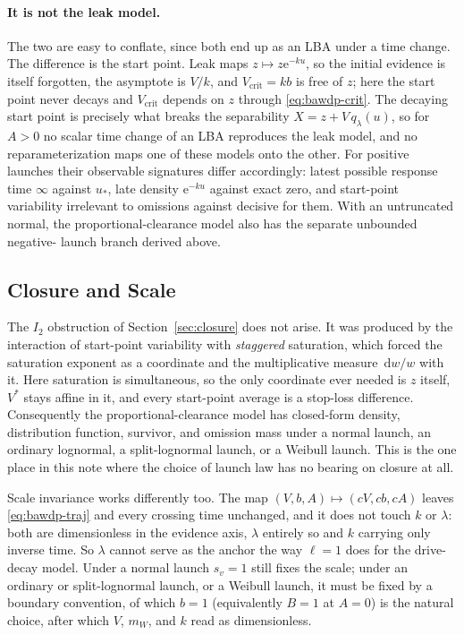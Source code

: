 \documentclass[12pt]{article}
\newcommand{\dd}{\,\mathrm{d}}
\newcommand{\e}{\mathrm{e}}
\theoremstyle{remark}
\begin{document}
\paragraph{It is not the leak model.} The two are easy to conflate, since both
end up as an LBA under a time change. The difference is the start point. Leak maps $z \mapsto z\e^{-ku}$, so the initial evidence is itself forgotten, the asymptote is $V/k$, and $V_{\mathrm{crit}} = kb$ is free of $z$; here the start point never decays and $V_{\mathrm{crit}}$ depends on $z$ through
\eqref{eq:bawdp-crit}. The decaying start point is precisely what breaks the
separability $X = z + V\,q_{\lambda}(u)$, so for $A > 0$ no scalar time change of an LBA reproduces the leak model, and no reparameterization maps one of these models onto the other. For positive launches their observable signatures differ accordingly: latest possible response time $\infty$ against $u_{*}$, late density $\e^{-ku}$ against exact zero, and start-point variability irrelevant to omissions against decisive for them. With an untruncated normal, the proportional-clearance model also has the separate unbounded negative- launch branch derived above.

\subsection{Closure and Scale}
The $I_2$ obstruction of Section~\ref{sec:closure} does not arise. It was produced by the interaction of start-point variability with \emph{staggered} saturation, which forced the saturation exponent as a coordinate and the multiplicative measure $\dd w / w$ with it. Here saturation is simultaneous, so the only coordinate ever needed is $z$ itself, $V^{*}$ stays affine in it, and every start-point average is a stop-loss difference. Consequently the proportional-clearance model has closed-form density, distribution function, survivor, and omission mass under a normal launch, an ordinary lognormal, a split-lognormal launch, or a Weibull launch. This is the one place in this note where the choice of launch law has no bearing on closure at all.

Scale invariance works differently too. The map $(V, b, A) \mapsto (cV, cb, cA)$ leaves \eqref{eq:bawdp-traj} and every crossing time unchanged, and it does not touch $k$ or $\lambda$: both are dimensionless in the evidence axis, $\lambda$ entirely so and $k$ carrying only inverse time. So $\lambda$ cannot serve as the anchor the way $\ell = 1$ does for the drive-decay model. Under a normal launch $s_v = 1$ still fixes the scale; under an ordinary or split-lognormal launch, or a Weibull launch, it must be fixed by a boundary convention, of which $b = 1$ (equivalently $B = 1$ at $A = 0$) is the natural choice, after which $V$, $m_W$, and $k$ read as dimensionless.
\end{document}
